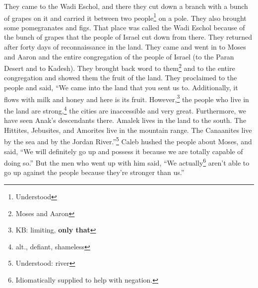 \begin{enumerate*}[mode=unboxed]
     They came to the Wadi Eschol, and there they cut down a branch with a bunch of grapes on it and carried it between two people\footnote{Understood} on a pole. They also brought some pomegranates and figs.%
     That place was called the Wadi Eschol because of the bunch of grapes that the people of Israel cut down from there.%
     They returned after forty days of reconnaissance in the land.%
     They came and went in to Moses and Aaron and the entire congregation of the people of Israel (to the Paran Desert and to Kadesh). They brought back word to them\footnote{Moses and Aaron} and to the entire congregation and showed them the fruit of the land.%
     They proclaimed to the people and said, ``We came into the land that you sent us to. Additionally, it flows with milk and honey and here is its fruit.%
     However,\footnote{KB: limiting, \textbf{only that}} the people who live in the land are strong,\footnote{alt., defiant, shameless} the cities are inaccessible and very great. Furthermore, we have seen Anak's descendants there.%
     Amalek lives in the land to the south. The Hittites, Jebusites, and Amorites live in the mountain range. The Canaanites live by the sea and by the Jordan River.''\footnote{Understood: river}%
     Caleb hushed the people about Moses, and said, ``We will definitely go up and possess it because we are totally capable of doing so.''%
     But the men who went up with him said, ``We actually\footnote{Idiomatically supplied to help with negation.} aren't able to go up against the people because they're stronger than us.''%
\end{enumerate*}
